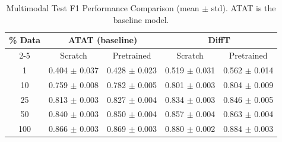 \begin{table}[h]
\centering
\caption{Multimodal Test F1 Performance Comparison (mean $\pm$ std). ATAT is the baseline model.}
\label{tab:multimodal_comparison}
\begin{tabular}{|c|cc|cc|}
\hline
\multirow{2}{*}{\% Data} & \multicolumn{2}{c|}{ATAT (baseline)} & \multicolumn{2}{c|}{DiffT} \\
\cline{2-5}
 & Scratch & Pretrained & Scratch & Pretrained \\
\hline
1 & 0.404 $\pm$ 0.037 & 0.428 $\pm$ 0.023 & 0.519 $\pm$ 0.031 & 0.562 $\pm$ 0.014 \\
10 & 0.759 $\pm$ 0.008 & 0.782 $\pm$ 0.005 & 0.801 $\pm$ 0.003 & 0.804 $\pm$ 0.009 \\
25 & 0.813 $\pm$ 0.003 & 0.827 $\pm$ 0.004 & 0.834 $\pm$ 0.003 & 0.846 $\pm$ 0.005 \\
50 & 0.840 $\pm$ 0.003 & 0.850 $\pm$ 0.004 & 0.857 $\pm$ 0.004 & 0.863 $\pm$ 0.004 \\
100 & 0.866 $\pm$ 0.003 & 0.869 $\pm$ 0.003 & 0.880 $\pm$ 0.002 & 0.884 $\pm$ 0.003 \\
\hline
\end{tabular}
\end{table}